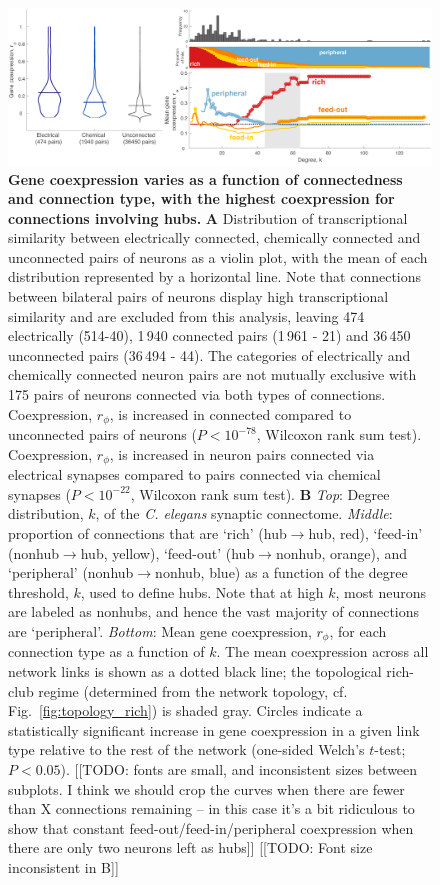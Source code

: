\documentclass[10pt,letterpaper]{article}
\begin{document}
 \begin{figure}[h]
 \centering
    \includegraphics[width=1\textwidth]{MeanCoexpressionALL.pdf}
 \caption{{\bf Gene coexpression varies as a function of connectedness and connection type, with the highest coexpression for connections involving hubs.}
\textbf{A} Distribution of transcriptional similarity between electrically connected, chemically connected and unconnected pairs of neurons as a violin plot, with the mean of each distribution represented by a horizontal line.
Note that connections between bilateral pairs of neurons display high transcriptional similarity and are excluded from this analysis, leaving 474 electrically (514-40), 1\,940 connected pairs (1\,961 - 21) and 36\,450 unconnected pairs (36\,494 - 44).
The categories of electrically and chemically connected neuron pairs are not mutually exclusive with 175 pairs of neurons connected via both types of connections. 
Coexpression, $r_\phi$, is increased in connected compared to unconnected pairs of neurons ($P < 10^{-78}$, Wilcoxon rank sum test).
Coexpression, $r_\phi$, is increased in neuron pairs connected via electrical synapses compared to pairs connected via chemical synapses ($P < 10^{-22}$, Wilcoxon rank sum test).
\textbf{B}
\emph{Top}: Degree distribution, $k$, of the \emph{C. elegans} synaptic connectome.
\emph{Middle}: proportion of connections that are `rich' (hub$\rightarrow$hub, red), `feed-in' (nonhub$\rightarrow$hub, yellow), `feed-out' (hub$\rightarrow$nonhub, orange), and `peripheral' (nonhub$\rightarrow$nonhub, blue) as a function of the degree threshold, $k$, used to define hubs.
Note that at high $k$, most neurons are labeled as nonhubs, and hence the vast majority of connections are `peripheral'.
\emph{Bottom}: Mean gene coexpression, $r_\phi$, for each connection type as a function of $k$.
The mean coexpression across all network links is shown as a dotted black line; the topological rich-club regime (determined from the network topology, cf. Fig.~\ref{fig:topology_rich}) is shaded gray.
Circles indicate a statistically significant increase in gene coexpression in a given link type relative to the rest of the network (one-sided Welch's $t$-test; $P < 0.05$).
[[TODO: fonts are small, and inconsistent sizes between subplots.
I think we should crop the curves when there are fewer than X connections remaining -- in this case it's a bit ridiculous to show that constant feed-out/feed-in/peripheral coexpression when there are only two neurons
left as hubs]]
[[TODO: Font size inconsistent in B]]
}
 \label{fig:coExp}
\end{figure}
\end{document}
